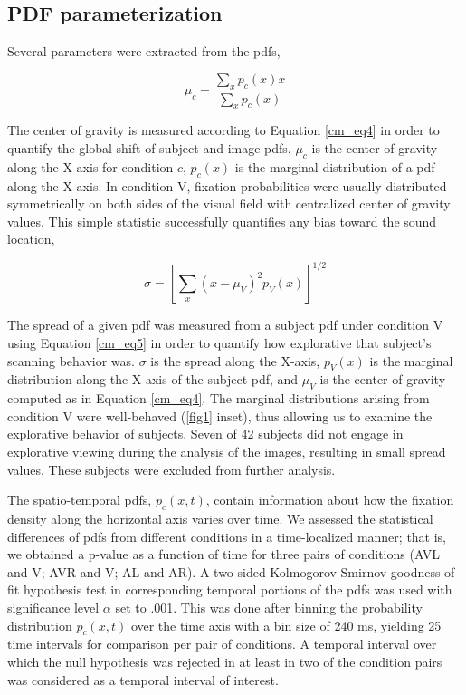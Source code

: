 \subsection{PDF parameterization}


Several parameters were extracted from the pdfs,


\begin{equation} \mu_c = \frac{\sum_x{p_c(x)x }}{\sum_x{p_c(x)}} \label{cm_eq4} \end{equation} 


The center of gravity is measured according to Equation \ref{cm_eq4} in
order to quantify the global shift of subject and image pdfs. $\mu_c$ is
the center of gravity along the X-axis for condition $c$, $p_c(x)$ is the
marginal distribution of a pdf along the X-axis. In condition V, fixation
probabilities were usually distributed symmetrically on both sides of the
visual field with centralized center of gravity values. This simple
statistic successfully quantifies any bias toward the sound location,

\begin{equation} \sigma = [ \sum_x{(x-\mu_V)^2 p_V(x)}  ]^{1/2}  \label{cm_eq5} \end{equation} 

The spread of a given pdf was measured from a subject pdf under condition V
using Equation  \ref{cm_eq5} in order to quantify how explorative that
subject's scanning behavior was. $\sigma$ is the spread along the X-axis,
$p_V(x)$ is the marginal distribution along the X-axis of the subject pdf,
and $\mu_V$ is the center of gravity computed as in Equation \ref{cm_eq4}.
The marginal distributions arising from condition V were well-behaved
(\ref{fig1} inset), thus allowing us to examine the explorative behavior of
subjects. Seven of 42 subjects did not engage in explorative viewing
during the analysis of the images, resulting in small spread values. These
subjects were excluded from further analysis.


The spatio-temporal pdfs, $p_c(x, t)$, contain information about how the
fixation density along the horizontal axis varies over time. We assessed
the statistical differences of pdfs from different conditions in a
time-localized manner; that is, we obtained a p-value as a function of time
for three pairs of conditions (AVL and V; AVR and V; AL and AR). A
two-sided Kolmogorov-Smirnov goodness-of-fit hypothesis test in
corresponding temporal portions of the pdfs was used with significance
level $\alpha$ set to .001. This was done after binning the probability
distribution $p_c(x, t)$ over the time axis with a bin size of 240 ms,
yielding 25 time intervals for comparison per pair of conditions. A
temporal interval over which the null hypothesis was rejected in at least
in two of the condition pairs was considered as a temporal interval of
interest.

